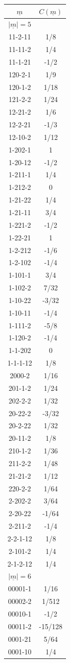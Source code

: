 \begin{tabular}[t]{|cc|}
\hline
$\underline{m}$ & $C(\underline{m})$\\
\hline\hline
$|\underline{m}|=5$&\\
\hline
11-2-11 &  1/8\\
11-11-2 &  1/4\\
11-1-21 &  -1/2\\
120-2-1 &  1/9\\
120-1-2 &  1/18\\
121-2-2 &  1/24\\
12-21-2 &  1/6\\
12-2-21 &  -1/3\\
12-10-2 &  1/12\\
1-202-1 &  1\\
1-20-12 &  -1/2\\
1-211-1 &  1/4\\
1-212-2 &  0\\
1-21-22 &  1/4\\
1-21-11 &  3/4\\
1-221-2 &  -1/2\\
1-22-21 &  1\\
1-2-212 &  -1/6\\
1-2-102 &  -1/4\\
1-101-1 &  3/4\\
1-102-2 &  7/32\\
1-10-22 &  -3/32\\
1-10-11 &  -1/4\\
1-111-2 &  -5/8\\
1-120-2 &  -1/4\\
1-1-202 &  0\\
1-1-1-12 &  1/8\\
2000-2 &  1/16\\
201-1-2 &  1/24\\
202-2-2 &  1/32\\
20-22-2 &  -3/32\\
20-2-22 &  1/32\\
20-11-2 &  1/8\\
210-1-2 &  1/36\\
211-2-2 &  1/48\\
21-21-2 &  1/12\\
220-2-2 &  1/64\\
2-202-2 &  3/64\\
2-20-22 &  -1/64\\
2-211-2 &  -1/4\\
2-2-1-12 &  1/8\\
2-101-2 &  1/4\\
2-1-2-12 &  1/4\\
\hline
$|\underline{m}|=6$&\\
\hline
00001-1 &  1/16\\
00002-2 &  1/512\\
00010-1 &  -1/2\\
00011-2 &  -15/128\\
0001-21 &  5/64\\
0001-10 &  1/4\\
\hline
\end{tabular}
